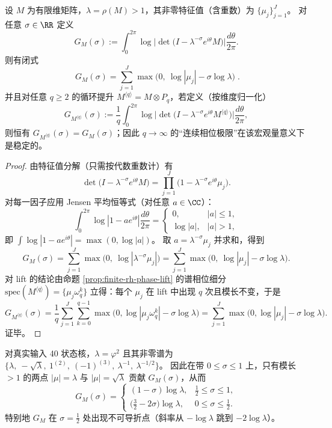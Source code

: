 \begin{proposition}\label{prop:finite-rh-jensen-free-energy}
设 \(M\) 为有限维矩阵，\(\lambda=\rho(M)>1\)，其非零特征值（含重数）为 \(\{\mu_j\}_{j=1}^{J}\)。
对任意 \(\sigma\in\RR\) 定义
\[
G_M(\sigma):=\int_0^{2\pi}\log\Big|\det\bigl(I-\lambda^{-\sigma}e^{i\theta}M\bigr)\Big|\frac{d\theta}{2\pi}.
\]
则有闭式
\[
\boxed{\;
G_M(\sigma)=\sum_{j=1}^{J}\max\bigl(0,\ \log|\mu_j|-\sigma\log\lambda\bigr)\; }.
\]
并且对任意 \(q\ge 2\) 的循环提升 \(M^{\langle q\rangle}=M\otimes P_q\)，若定义（按维度归一化）
\[
G_{M^{\langle q\rangle}}(\sigma):=\frac{1}{q}\int_0^{2\pi}\log\Big|\det\bigl(I-\lambda^{-\sigma}e^{i\theta}M^{\langle q\rangle}\bigr)\Big|\frac{d\theta}{2\pi},
\]
则恒有 \(G_{M^{\langle q\rangle}}(\sigma)=G_M(\sigma)\)；因此 \(q\to\infty\) 的“连续相位极限”在该宏观量意义下是稳定的。
\end{proposition}
\begin{proof}
由特征值分解（只需按代数重数计）有
\[
\det\bigl(I-\lambda^{-\sigma}e^{i\theta}M\bigr)=\prod_{j=1}^{J}\bigl(1-\lambda^{-\sigma}e^{i\theta}\mu_j\bigr).
\]
对每一因子应用 Jensen 平均恒等式（对任意 \(a\in\CC\)）：
\[
\int_0^{2\pi}\log|1-ae^{i\theta}|\frac{d\theta}{2\pi}
=
\begin{cases}
0,&|a|\le 1,\\
\log|a|,&|a|>1,
\end{cases}
\]
即
\(
\int \log|1-ae^{i\theta}|= \max(0,\log|a|)
\)。
取 \(a=\lambda^{-\sigma}\mu_j\) 并求和，得到
\[
G_M(\sigma)=\sum_{j=1}^{J}\max\bigl(0,\ \log|\lambda^{-\sigma}\mu_j|\bigr)
=\sum_{j=1}^{J}\max\bigl(0,\ \log|\mu_j|-\sigma\log\lambda\bigr).
\]
对 lift 的结论由命题 \ref{prop:finite-rh-phase-lift} 的谱相位细分
\(\mathrm{spec}(M^{\langle q\rangle})=\{\mu_j\omega_q^k\}\)
立得：每个 \(\mu_j\) 在 lift 中出现 \(q\) 次且模长不变，于是
\[
G_{M^{\langle q\rangle}}(\sigma)=\frac{1}{q}\sum_{j=1}^J\sum_{k=0}^{q-1}\max\bigl(0,\log|\mu_j\omega_q^k|-\sigma\log\lambda\bigr)=\sum_{j=1}^J\max\bigl(0,\log|\mu_j|-\sigma\log\lambda\bigr).
\]
证毕。
\end{proof}

\begin{corollary}[真实输入 40 状态核的临界折点：\texorpdfstring{$\sigma=\tfrac12$}{sigma=1/2}]\label{cor:real-input-40-jensen-kink}
对真实输入 40 状态核，\(\lambda=\varphi^2\) 且其非零谱为
\(\{\lambda,\ -\sqrt{\lambda},\ 1^{(2)},\ (-1)^{(3)},\ \lambda^{-1},\ \lambda^{-1/2}\}\)。
因此在带 \(0\le \sigma\le 1\) 上，只有模长 \(>\!1\) 的两点 \(|\mu|=\lambda\) 与 \(|\mu|=\sqrt{\lambda}\) 贡献 \(G_M(\sigma)\)，从而
\[
G_M(\sigma)=
\begin{cases}
(1-\sigma)\log\lambda,&\tfrac12\le \sigma\le 1,\\[4pt]
\bigl(\tfrac32-2\sigma\bigr)\log\lambda,&0\le \sigma\le \tfrac12.
\end{cases}
\]
特别地 \(G_M\) 在 \(\sigma=\tfrac12\) 处出现不可导折点（斜率从 \(-\log\lambda\) 跳到 \(-2\log\lambda\)）。
\end{corollary}

